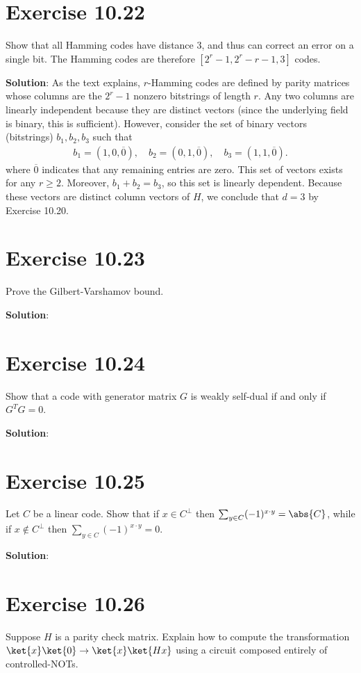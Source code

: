 \documentclass{book}
\begin{document}
\section*{Exercise 10.22}
    Show that all Hamming codes have distance 3, and thus can correct an error on a single bit. The Hamming codes are therefore $[2^r - 1, 2^r - r - 1, 3]$ codes. 
    
    \textbf{Solution}: As the text explains, $r$-Hamming codes are defined by parity matrices whose columns are the $2^r - 1$ nonzero bitstrings of length $r$. Any two columns are linearly independent because they are distinct vectors (since the underlying field is binary, this is sufficient). However, consider the set of binary vectors (bitstrings) $b_1, b_2, b_3$ such that
    \begin{align}
        b_1 = (1,0,\overline{0}), \quad b_2 = (0,1,\overline{0}), \quad b_3 = (1,1,\overline{0}).
    \end{align}
    where $\overline{0}$ indicates that any remaining entries are zero. This set of vectors exists for any $r \geq 2.$ Moreover, $b_1 + b_2 = b_3$, so this set is linearly dependent. Because these vectors are distinct column vectors of $H$, we conclude that $d = 3$ by Exercise 10.20.

\section*{Exercise 10.23}
    Prove the Gilbert-Varshamov bound. 

    \textbf{Solution}:

\section*{Exercise 10.24}
    Show that a code with generator matrix $G$ is weakly self-dual if and only if $G^T G = 0$. 

    \textbf{Solution}:

\section*{Exercise 10.25}
    Let $C$ be a linear code. Show that if $x \in C^\perp$ then $\sum_{y\in C} (-1)^{x\cdot y} = \abs{C}$, while if $x \notin C^\perp$ then $\sum_{y\in C} (-1)^{x\cdot y} = 0$.

    \textbf{Solution}:

\section*{Exercise 10.26}
    Suppose $H$ is a parity check matrix. Explain how to compute the transformation $\ket{x}\ket{0} \to \ket{x}\ket{Hx}$ using a circuit composed entirely of controlled-NOTs. 
\end{document}
